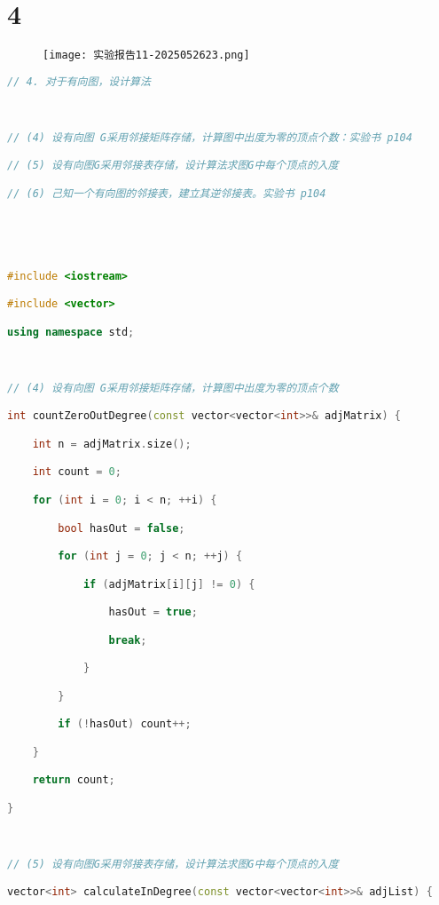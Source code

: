 \section{4}

\begin{figure}[H]
\centering
\texttt{[image: 实验报告11-2025052623.png]}
\label{}
\end{figure}

\begin{lstlisting}[language=C++]
// 4. 对于有向图，设计算法

  

// (4) 设有向图 G采用邻接矩阵存储，计算图中出度为零的顶点个数：实验书 p104

// (5) 设有向图G采用邻接表存储，设计算法求图G中每个顶点的入度

// (6) 己知一个有向图的邻接表，建立其逆邻接表。实验书 p104

  
  
  

#include <iostream>

#include <vector>

using namespace std;

  

// (4) 设有向图 G采用邻接矩阵存储，计算图中出度为零的顶点个数

int countZeroOutDegree(const vector<vector<int>>& adjMatrix) {

    int n = adjMatrix.size();

    int count = 0;

    for (int i = 0; i < n; ++i) {

        bool hasOut = false;

        for (int j = 0; j < n; ++j) {

            if (adjMatrix[i][j] != 0) {

                hasOut = true;

                break;

            }

        }

        if (!hasOut) count++;

    }

    return count;

}

  

// (5) 设有向图G采用邻接表存储，设计算法求图G中每个顶点的入度

vector<int> calculateInDegree(const vector<vector<int>>& adjList) {


\end{lstlisting}
